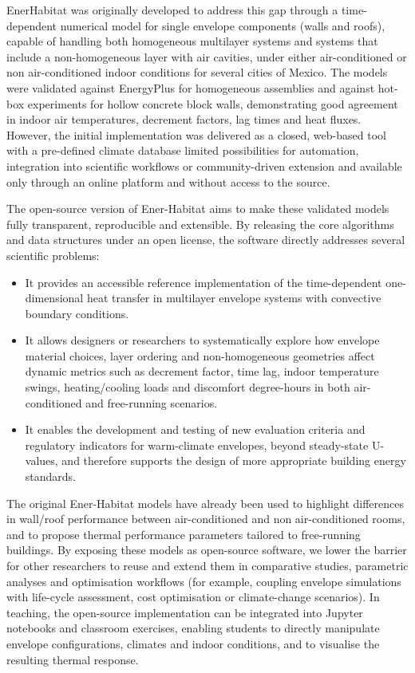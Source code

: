 \documentclass[preprint,12pt, a4paper]{elsarticle}
\begin{document}
EnerHabitat was originally developed to address this gap through a time-dependent numerical model for single envelope components (walls and roofs), capable of handling both homogeneous multilayer systems and systems that include a non-homogeneous layer with air cavities, under either air-conditioned or non air-conditioned indoor conditions for several cities of Mexico.\citep{barrios2016enerhabitat} The models were validated against EnergyPlus for homogeneous assemblies and against hot-box experiments for hollow concrete block walls, demonstrating good agreement in indoor air temperatures, decrement factors, lag times and heat fluxes. However, the initial implementation was delivered as a closed, web-based tool with  a pre-defined climate database limited possibilities for automation, integration into scientific workflows or community-driven extension and available only through an online platform and without access to the source.

The open-source version of Ener-Habitat aims to make these validated models fully transparent, reproducible and extensible. By releasing the core algorithms and data structures under an open license, the software directly addresses several scientific problems:

\begin{itemize}
\item It provides an accessible reference implementation of the time-dependent one-dimensional  heat transfer in multilayer envelope systems with convective boundary conditions.
\item It allows designers or researchers to systematically explore how envelope material choices, layer ordering and non-homogeneous geometries affect dynamic metrics such as decrement factor, time lag, indoor temperature swings, heating/cooling loads and discomfort degree-hours in both air-conditioned and free-running scenarios.
\item It enables the development and testing of new evaluation criteria and regulatory indicators for warm-climate envelopes, beyond steady-state U-values, and therefore supports the design of more appropriate building energy standards.
\end{itemize}

The original Ener-Habitat models have already been used to highlight differences in wall/roof performance between air-conditioned and non air-conditioned rooms, and to propose thermal performance parameters tailored to free-running buildings.\citep{barrios2011wall,barrios2012envelope} By exposing these models as open-source software, we lower the barrier for other researchers to reuse and extend them in comparative studies, parametric analyses and optimisation workflows (for example, coupling envelope simulations with life-cycle assessment, cost optimisation or climate-change scenarios). In teaching, the open-source implementation can be integrated into Jupyter notebooks and classroom exercises, enabling students to directly manipulate envelope configurations, climates and indoor conditions, and to visualise the resulting thermal response.
\end{document}
